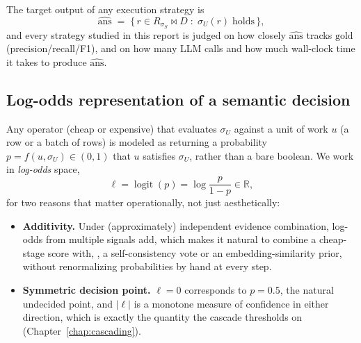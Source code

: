 The target output of any execution strategy is
\[
  \widehat{\mathrm{ans}} \;=\; \bigl\{\, r \in R_{\sigma_S} \bowtie D \;:\; \sigma_U(r) \;\text{holds} \,\bigr\},
\]
and every strategy studied in this report is judged on how closely
$\widehat{\mathrm{ans}}$ tracks $\mathrm{gold}$ (precision/recall/F1), and
on how many LLM calls and how much wall-clock time it takes to produce
$\widehat{\mathrm{ans}}$.

\subsection{Log-odds representation of a semantic decision}
\label{sec:log-odds}
Any operator (cheap or expensive) that evaluates $\sigma_U$ against a
unit of work $u$ (a row or a batch of rows) is modeled as returning a
probability $p = f(u, \sigma_U) \in (0,1)$ that $u$ satisfies $\sigma_U$,
rather than a bare boolean. We work in \emph{log-odds} space,
\[
  \ell = \operatorname{logit}(p) = \log \frac{p}{1-p} \in \mathbb{R},
\]
for two reasons that matter operationally, not just aesthetically:
\begin{itemize}
  \item \textbf{Additivity.} Under (approximately) independent evidence
        combination, log-odds from multiple signals add, which makes it
        natural to combine a cheap-stage score with, \eg, a
        self-consistency vote or an embedding-similarity prior, without
        renormalizing probabilities by hand at every step.
  \item \textbf{Symmetric decision point.} $\ell = 0$ corresponds to
        $p = 0.5$, the natural undecided point, and $|\ell|$ is a
        monotone measure of confidence in either direction, which is
        exactly the quantity the cascade thresholds on
        (Chapter~\ref{chap:cascading}).
\end{itemize}
